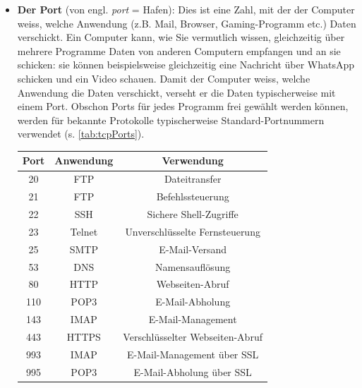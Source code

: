 \begin{itemize}
	\item \textbf{Der Port} (von engl. \textit{port} = Hafen): Dies ist eine Zahl, mit der der Computer weiss, welche Anwendung (z.B. Mail, Browser, Gaming-Programm etc.) Daten verschickt. Ein Computer kann, wie Sie vermutlich wissen, gleichzeitig über mehrere Programme Daten von anderen Computern empfangen und an sie schicken: sie können beispielsweise gleichzeitig eine Nachricht über WhatsApp schicken und ein Video schauen. Damit der Computer weiss, welche Anwendung die Daten verschickt, verseht er die Daten typischerweise mit einem Port. Obschon Ports für jedes Programm frei gewählt werden können, werden für bekannte Protokolle typischerweise Standard-Portnummern verwendet (s. \cref{tab:tcpPorts}).
	      \begin{table}[H]
		      \centering
		      \begin{tabular}{c||c|c}
			      \toprule
			      \textbf{Port} & \textbf{Anwendung} & \textbf{Verwendung}                   \\
			      \midrule
			      20            & \acrfull{FTP}      & Dateitransfer                         \\
			      21            & \acrfull{FTP}      & Befehlssteuerung                      \\
			      22            & \acrfull{SSH}      & Sichere Shell-Zugriffe                \\
			      23            & Telnet             & Unverschlüsselte Fernsteuerung        \\
			      25            & \acrfull{SMTP}     & E-Mail-Versand                        \\
			      53            & \acrfull{DNS}      & Namensauflösung                       \\
			      80            & \acrfull{HTTP}     & Webseiten-Abruf                       \\
			      110           & \acrfull{POP3}     & E-Mail-Abholung                       \\
			      143           & \acrfull{IMAP}     & E-Mail-Management                     \\
			      443           & \acrfull{HTTPS}    & Verschlüsselter Webseiten-Abruf       \\
			      993           & \acrfull{IMAP}     & E-Mail-Management über \acrshort{SSL} \\
			      995           & \acrfull{POP3}     & E-Mail-Abholung über \acrshort{SSL}   \\

\end{tabular}
\end{table}
\end{itemize}
